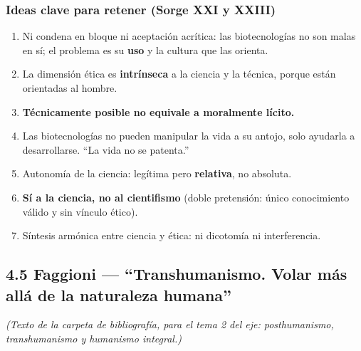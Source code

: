 \documentclass[10pt,a4paper]{article}
\begin{document}
\subsubsection{Ideas clave para retener (Sorge XXI y XXIII)}
\begin{enumerate}
\item Ni condena en bloque ni aceptación acrítica: las biotecnologías no son malas en sí; el problema es su \textbf{uso} y la cultura que las orienta.
\item La dimensión ética es \textbf{intrínseca} a la ciencia y la técnica, porque están orientadas al hombre.
\item \textbf{Técnicamente posible no equivale a moralmente lícito.}
\item Las biotecnologías no pueden manipular la vida a su antojo, solo ayudarla a desarrollarse. ``La vida no se patenta.''
\item Autonomía de la ciencia: legítima pero \textbf{relativa}, no absoluta.
\item \textbf{Sí a la ciencia, no al cientifismo} (doble pretensión: único conocimiento válido y sin vínculo ético).
\item Síntesis armónica entre ciencia y ética: ni dicotomía ni interferencia.
\end{enumerate}



\subsection{4.5 Faggioni --- ``Transhumanismo. Volar más allá de la naturaleza humana''}

\noindent \textit{(Texto de la carpeta de bibliografía, para el tema 2 del eje: posthumanismo, transhumanismo y humanismo integral.)}\par\smallskip
\end{document}
